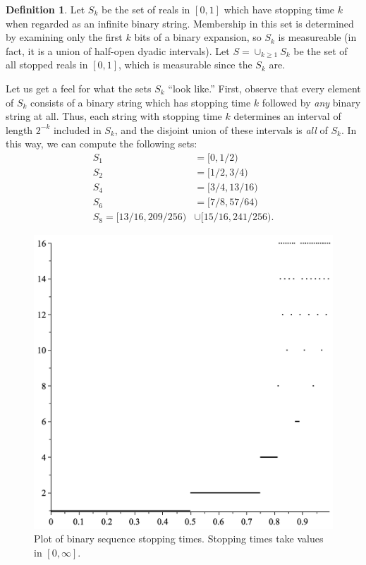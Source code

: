 \documentclass[12pt]{article}
\theoremstyle{definition}
\newtheorem{definition}{Definition}
\begin{document}
\begin{definition}
    Let $S_k$ be the set of reals in $[0, 1]$ which have stopping time $k$ when
    regarded as an infinite binary string. Membership in this set is determined
    by examining only the first $k$ bits of a binary expansion, so $S_k$ is
    measureable (in fact, it is a union of half-open dyadic intervals). Let $S = \cup_{k \geq 1} S_k$ be the set of all stopped reals
    in $[0, 1]$, which is measurable since the $S_k$ are.
\end{definition}

Let us get a feel for what the sets $S_k$ ``look like.'' First, observe that
every element of $S_k$ consists of a binary string which has stopping time $k$
followed by \emph{any} binary string at all. Thus, each string with stopping
time $k$ determines an interval of length $2^{-k}$ included in $S_k$, and the
disjoint union of these intervals is \emph{all} of $S_k$. In this way, we can
compute the following sets:
\begin{align*}
    S_1 &= [0, 1/2) \\
    S_2 &= [1/2, 3/4) \\
    S_4 &= [3/4, 13/16) \\
    S_6 &= [7/8, 57/64) \\
    S_8 = [13/16, 209/256) &\cup [15/16, 241/256).
\end{align*}

\begin{figure}
\includegraphics[width=\textwidth]{fig1.png}
\caption{Plot of binary sequence stopping times. Stopping times take values in $[0,\infty].$}
\end{figure}
\end{document}
